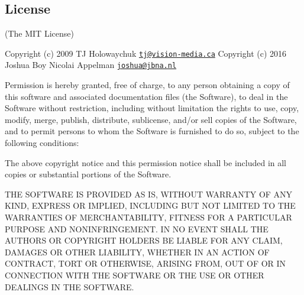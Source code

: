 \subsection*{License}

(The M\+IT License)

Copyright (c) 2009 TJ Holowaychuk \href{mailto:tj@vision-media.ca}{\tt tj@vision-\/media.\+ca} Copyright (c) 2016 Joshua Boy Nicolai Appelman \href{mailto:joshua@jbna.nl}{\tt joshua@jbna.\+nl}

Permission is hereby granted, free of charge, to any person obtaining a copy of this software and associated documentation files (the \textquotesingle{}Software\textquotesingle{}), to deal in the Software without restriction, including without limitation the rights to use, copy, modify, merge, publish, distribute, sublicense, and/or sell copies of the Software, and to permit persons to whom the Software is furnished to do so, subject to the following conditions\+:

The above copyright notice and this permission notice shall be included in all copies or substantial portions of the Software.

T\+HE S\+O\+F\+T\+W\+A\+RE IS P\+R\+O\+V\+I\+D\+ED \textquotesingle{}AS IS\textquotesingle{}, W\+I\+T\+H\+O\+UT W\+A\+R\+R\+A\+N\+TY OF A\+NY K\+I\+ND, E\+X\+P\+R\+E\+SS OR I\+M\+P\+L\+I\+ED, I\+N\+C\+L\+U\+D\+I\+NG B\+UT N\+OT L\+I\+M\+I\+T\+ED TO T\+HE W\+A\+R\+R\+A\+N\+T\+I\+ES OF M\+E\+R\+C\+H\+A\+N\+T\+A\+B\+I\+L\+I\+TY, F\+I\+T\+N\+E\+SS F\+OR A P\+A\+R\+T\+I\+C\+U\+L\+AR P\+U\+R\+P\+O\+SE A\+ND N\+O\+N\+I\+N\+F\+R\+I\+N\+G\+E\+M\+E\+NT. IN NO E\+V\+E\+NT S\+H\+A\+LL T\+HE A\+U\+T\+H\+O\+RS OR C\+O\+P\+Y\+R\+I\+G\+HT H\+O\+L\+D\+E\+RS BE L\+I\+A\+B\+LE F\+OR A\+NY C\+L\+A\+IM, D\+A\+M\+A\+G\+ES OR O\+T\+H\+ER L\+I\+A\+B\+I\+L\+I\+TY, W\+H\+E\+T\+H\+ER IN AN A\+C\+T\+I\+ON OF C\+O\+N\+T\+R\+A\+CT, T\+O\+RT OR O\+T\+H\+E\+R\+W\+I\+SE, A\+R\+I\+S\+I\+NG F\+R\+OM, O\+UT OF OR IN C\+O\+N\+N\+E\+C\+T\+I\+ON W\+I\+TH T\+HE S\+O\+F\+T\+W\+A\+RE OR T\+HE U\+SE OR O\+T\+H\+ER D\+E\+A\+L\+I\+N\+GS IN T\+HE S\+O\+F\+T\+W\+A\+RE. 
